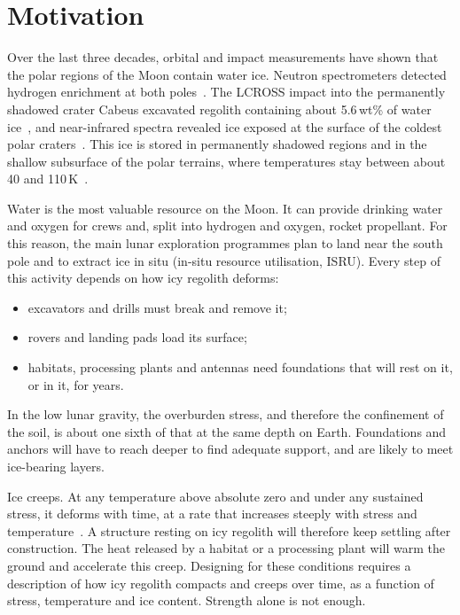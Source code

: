 
\section*{Motivation}

Over the last three decades, orbital and impact measurements have shown that the polar regions of the Moon contain water ice. Neutron spectrometers detected hydrogen enrichment at both poles~\cite{feldman1998,mitrofanov2010}. The LCROSS impact into the permanently shadowed crater Cabeus excavated regolith containing about 5.6\,wt\% of water ice~\cite{colaprete2010}, and near-infrared spectra revealed ice exposed at the surface of the coldest polar craters~\cite{li2018}. This ice is stored in permanently shadowed regions and in the shallow subsurface of the polar terrains, where temperatures stay between about 40 and 110\,K~\cite{paige2010,williams2019}.

Water is the most valuable resource on the Moon. It can provide drinking water and oxygen for crews and, split into hydrogen and oxygen, rocket propellant. For this reason, the main lunar exploration programmes plan to land near the south pole and to extract ice in situ (in-situ resource utilisation, ISRU). Every step of this activity depends on how icy regolith deforms:
\begin{itemize}
    \item excavators and drills must break and remove it;
    \item rovers and landing pads load its surface;
    \item habitats, processing plants and antennas need foundations that will rest on it, or in it, for years.
\end{itemize}
In the low lunar gravity, the overburden stress, and therefore the confinement of the soil, is about one sixth of that at the same depth on Earth. Foundations and anchors will have to reach deeper to find adequate support, and are likely to meet ice-bearing layers.

Ice creeps. At any temperature above absolute zero and under any sustained stress, it deforms with time, at a rate that increases steeply with stress and temperature~\cite{glen1955,goldsby2001}. A structure resting on icy regolith will therefore keep settling after construction. The heat released by a habitat or a processing plant will warm the ground and accelerate this creep. Designing for these conditions requires a description of how icy regolith compacts and creeps over time, as a function of stress, temperature and ice content. Strength alone is not enough.

